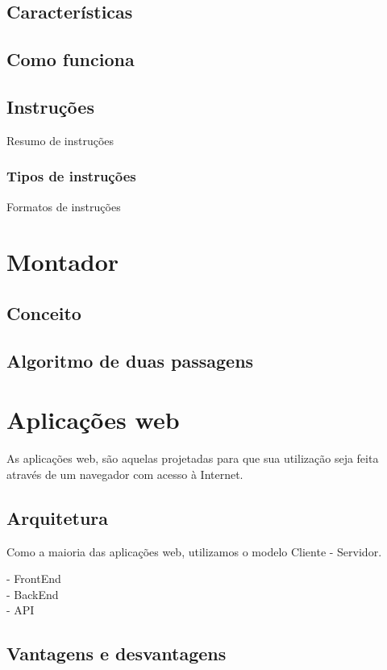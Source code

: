 	\subsection{Características}
	\subsection{Como funciona}
	\subsection{Instruções}
		Resumo de instruções\\
		\subsubsection{Tipos de instruções}
		Formatos de instruções

\section{Montador}


	\subsection{Conceito}

	\subsection{Algoritmo de duas passagens}

\section{Aplicações web}

	As aplicações web, são aquelas projetadas para que sua utilização seja feita através de um navegador com acesso à Internet.

	\subsection{Arquitetura}
		
		Como a maioria das aplicações web, utilizamos o modelo Cliente - Servidor.

		- FrontEnd\\
		- BackEnd \\
			- API\\

	\subsection{Vantagens e desvantagens}

